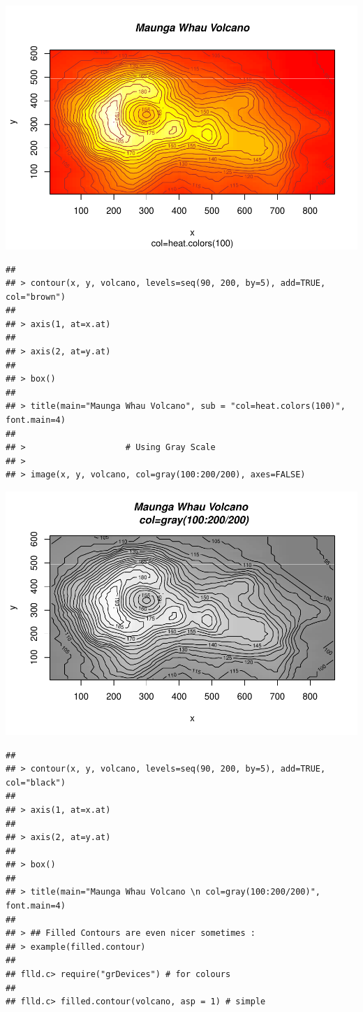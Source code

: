 \documentclass[]{book}
\begin{document}
\includegraphics{TudodoR_files/figure-latex/unnamed-chunk-145-2.pdf}

\begin{verbatim}
## 
## > contour(x, y, volcano, levels=seq(90, 200, by=5), add=TRUE, col="brown")
## 
## > axis(1, at=x.at)
## 
## > axis(2, at=y.at)
## 
## > box()
## 
## > title(main="Maunga Whau Volcano", sub = "col=heat.colors(100)", font.main=4)
## 
## >                    # Using Gray Scale
## > 
## > image(x, y, volcano, col=gray(100:200/200), axes=FALSE)
\end{verbatim}

\includegraphics{TudodoR_files/figure-latex/unnamed-chunk-145-3.pdf}

\begin{verbatim}
## 
## > contour(x, y, volcano, levels=seq(90, 200, by=5), add=TRUE, col="black")
## 
## > axis(1, at=x.at)
## 
## > axis(2, at=y.at)
## 
## > box()
## 
## > title(main="Maunga Whau Volcano \n col=gray(100:200/200)", font.main=4)
## 
## > ## Filled Contours are even nicer sometimes :
## > example(filled.contour)
## 
## flld.c> require("grDevices") # for colours
## 
## flld.c> filled.contour(volcano, asp = 1) # simple
\end{verbatim}
\end{document}
